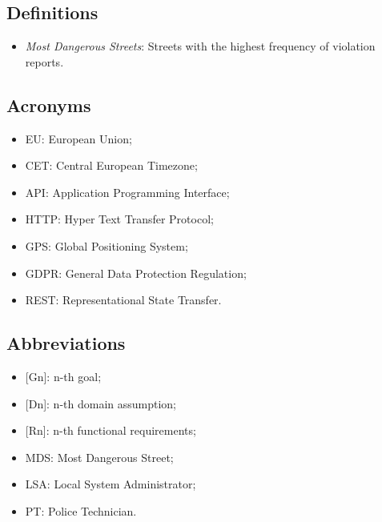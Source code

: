 \subsection{Definitions}
\begin{itemize}
  \item \textit{Most Dangerous Streets}: Streets with the highest frequency of violation reports.
\end{itemize}

\subsection{Acronyms}
\begin{itemize}
  \item EU: European Union;
  \item CET: Central European Timezone;
  \item API: Application Programming Interface;
  \item HTTP: Hyper Text Transfer Protocol;
  \item GPS: Global Positioning System;
  \item GDPR: General Data Protection Regulation;
  \item REST: Representational State Transfer.
\end{itemize}

\subsection{Abbreviations}
\begin{itemize}
  \item {[Gn]}: n-th goal;
  \item {[Dn]}: n-th domain assumption;
  \item {[Rn]}: n-th functional requirements;
  \item MDS: Most Dangerous Street;
  \item LSA: Local System Administrator;
  \item PT: Police Technician.
\end{itemize}
